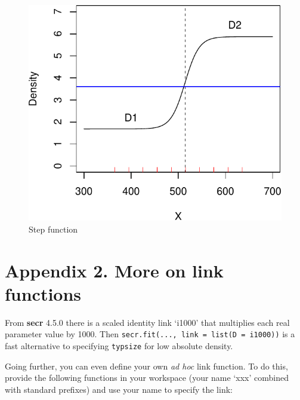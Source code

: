 \documentclass[
]{book}
\begin{document}
\begin{figure}
\centering
\includegraphics{SECRbook_files/figure-latex/stepplot-1.pdf}
\caption{\label{fig:stepplot}Step function}
\end{figure}

\section{Appendix 2. More on link functions}\label{linkappendix}

From \textbf{secr} 4.5.0 there is a scaled identity link `i1000' that multiplies each real parameter value by 1000. Then \texttt{secr.fit(...,\ link\ =\ list(D\ =\ \textquotesingle{}i1000\textquotesingle{}))} is a fast alternative to specifying \texttt{typsize} for low absolute density.

Going further, you can even define your own \emph{ad hoc} link function. To do this, provide the following functions in your workspace (your name `xxx' combined with standard prefixes) and use your name to specify the link:
\end{document}
